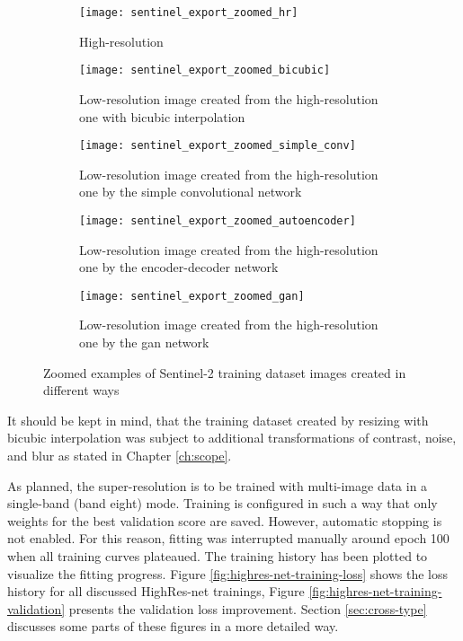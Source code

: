 \begin{figure}
        \begin{subfigure}[t]{0.3\textwidth}
        \centering
        \texttt{[image: sentinel\_export\_zoomed\_hr]}
        \caption{High-resolution}
    \end{subfigure}
    \hfill
    \begin{subfigure}[t]{0.3\textwidth}
        \centering
        \texttt{[image: sentinel\_export\_zoomed\_bicubic]}
        \caption{Low-resolution image created from the high-resolution one with bicubic interpolation}
    \end{subfigure}
    \hfill
    \begin{subfigure}[t]{0.3\textwidth}
        \centering
        \texttt{[image: sentinel\_export\_zoomed\_simple\_conv]}
        \caption{Low-resolution image created from the high-resolution one by the simple convolutional network}
    \end{subfigure}
    \hfill
    \medskip
    \centering
    \hfill
    \begin{subfigure}[t]{0.3\textwidth}
        \centering
        \texttt{[image: sentinel\_export\_zoomed\_autoencoder]}
        \caption{Low-resolution image created from the high-resolution one by the encoder-decoder network}
    \end{subfigure}
    \quad
    \begin{subfigure}[t]{0.3\textwidth}
        \centering
        \texttt{[image: sentinel\_export\_zoomed\_gan]}
        \caption{Low-resolution image created from the high-resolution one by the \gls{gan} network}
    \end{subfigure}
    \hfill
    \caption{Zoomed examples of Sentinel-2 training dataset images created in different ways}
    \label{fig:export-example-zoomed}
\end{figure}

It should be kept in mind, that the training dataset created by resizing with bicubic interpolation was subject to additional transformations of contrast, noise, and blur as stated in Chapter \ref{ch:scope}.

As planned, the super-resolution is to be trained with multi-image data in a single-band (band eight) mode.
Training is configured in such a way that only weights for the best validation score are saved.
However, automatic stopping is not enabled.
For this reason, fitting was interrupted manually around epoch 100 when all training curves plateaued.
The training history has been plotted to visualize the fitting progress.
Figure \ref{fig:highres-net-training-loss} shows the loss history for all discussed HighRes-net trainings, Figure \ref{fig:highres-net-training-validation} presents the validation loss improvement.
Section \ref{sec:cross-type} discusses some parts of these figures in a more detailed way. 

